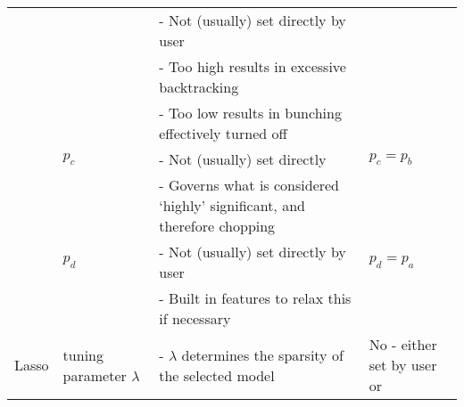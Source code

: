 \begin{landscape}
\begin{table}[]
\begin{tabular}{p{2cm} | p{3 cm}| p{11cm}| p{4cm}}
                   
                 &                                                 & - Not (usually) set directly by user                                                                                                                                                      &                                                    \\
                   &                                                    & - Too high results in excessive backtracking                                                                                                                                              &                                                    \\
                   &                                                    & - Too low results in bunching effectively turned off                                                                                                                                      &                                                    \\
   \hline                & $p_{c}$                                            & - Not (usually) set directly                                                                                                                                                              & $p_{c} = p_{b}$                                    \\
                   &                                                    & - Governs what is considered `highly' significant, and therefore chopping                                                                                                                 &                                                    \\
 \hline                  & $p_{d}$                                            & - Not (usually) set directly by user                                                                                                                                                      & $p_{d} = p_{a}$                                            \\
                   &                                                    & - Built in features to relax this if necessary                                                                                                                                            &                                                    \\
\hline
\hline
Lasso              & tuning parameter $\lambda$                         & - $\lambda$ determines the sparsity of the selected model                                                                                                                                 &    No - either set by user or                                           \\


\end{tabular}
\end{table}
\end{landscape}
